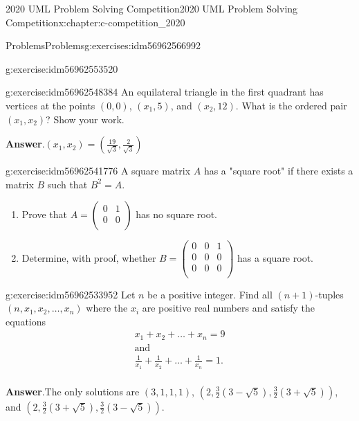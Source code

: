 \documentclass[twoside,10pt,]{book}
\newcommand{\blocktitlefont}{\relax}
\numberwithin{equation}{section}
\begin{document}
\begin{chapterptx}{2020 UML Problem Solving Competition}{}{2020 UML Problem Solving Competition}{}{}{x:chapter:c-competition_2020}
\begin{exercises-section}{Problems}{}{Problems}{}{}{g:exercises:idm56962566992}
\begin{divisionexercise}{2}{}{}{g:exercise:idm56962553520}
\end{divisionexercise}%
\begin{divisionexercise}{3}{}{}{g:exercise:idm56962548384}%
An equilateral triangle in the first quadrant has vertices at the points \((0, 0)\), \((x_1, 5)\), and \((x_2, 12)\). What is the ordered pair \((x_1, x_2)\)?  Show your work.%
\par\smallskip%
\noindent\textbf{\blocktitlefont Answer}.\hypertarget{g:answer:idm56962544448}{}\quad{}\((x_1,x_2)=(\frac{19}{\sqrt{3}},\frac{2}{\sqrt{3}})\)%
\end{divisionexercise}%
\begin{divisionexercise}{4}{}{}{g:exercise:idm56962541776}%
A square matrix \(A\) has a "square root" if there exists a matrix \(B\) such that \(B^2 = A\).%
\begin{enumerate}[label=(\alph*)]
\item{}Prove that \(A = \left(
\begin{array}{cc}
0 & 1 \\
0 & 0 \\
\end{array}
\right)\)  has no square root.%
\item{}Determine, with proof, whether \(B=\left(
\begin{array}{ccc}
0 & 0 & 1 \\
0 & 0 & 0 \\
0 & 0 & 0 \\
\end{array}
\right)\) has a square root.%
\end{enumerate}
%
\end{divisionexercise}%
\begin{divisionexercise}{5}{}{}{g:exercise:idm56962533952}%
Let \(n\) be a positive integer.  Find all \((n+1)\)-tuples \((n, x_1, x_2, \dots , x_n)\) where the \(x_i\) are positive real numbers and satisfy the equations%
\begin{equation*}
\begin{array}{cc}
x_1 + x_2 + \dots + x_n = 9 \\
\textrm{and}\\
\frac{1}{x_1}+\frac{1}{x_2} + \dots + \frac{1}{x_n} = 1. \\
\end{array}
\end{equation*}
%
\par\smallskip%
\noindent\textbf{\blocktitlefont Answer}.\hypertarget{g:answer:idm56962522800}{}\quad{}The only solutions are \((3,1,1,1)\), \((2,\frac{3}{2} \left(3-\sqrt{5}\right) , \frac{3}{2} \left(3+\sqrt{5}\right))\), and \((2,\frac{3}{2} \left(3+\sqrt{5}\right) , \frac{3}{2} \left(3-\sqrt{5}\right))\).%

\end{divisionexercise}
\end{exercises-section}
\end{chapterptx}
\end{document}
